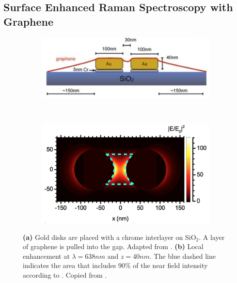 \subsection{Surface Enhanced Raman Spectroscopy with Graphene}

\begin{figure}[!h]
  \centering
  \begin{subfigure}{0.45\textwidth}
    \includegraphics[width=\textwidth]{./images/sers-schema.png}
  \end{subfigure}
  ~
  \begin{subfigure}{0.45\textwidth}
    \includegraphics[width=\textwidth]{./images/local-enhancement-heeg.png}
  \end{subfigure}
  \caption{\textbf{(a)} Gold disks are placed with a chrome interlayer on SiO$_2$. A layer of graphene is pulled into the gap. Adapted from \cite{heeg}. \textbf{(b)} Local enhancement at $\lambda = 638nm$ and $z=40nm$. The blue dashed line indicates the area that includes 90\% of the near field intensity according to \cite{heeg}. Copied from \cite{heeg}.}
\end{figure}

